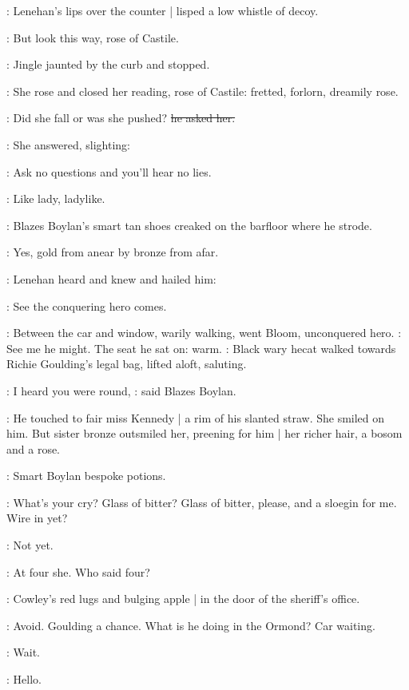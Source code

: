 
:
Lenehan's lips over the counter |
lisped a low whistle of decoy.

\lenehan:
But look this way, rose of Castile.

:
Jingle jaunted by the curb
and stopped.

:
She rose and closed her reading,
rose of Castile:
fretted, forlorn,
dreamily rose.

\lenehan:
Did she fall or was she pushed?
\sout{he asked her.}

:
She answered,
slighting:

\MissK:
Ask no questions and you'll hear no lies.

:
Like lady,
ladylike.

:
Blazes Boylan's smart tan shoes creaked on the barfloor
where he strode.

:
Yes, gold from anear
by bronze from afar.

:
Lenehan heard and knew and hailed him:

\lenehan:
See the conquering hero comes.

:
Between the car and window,
warily walking,
went Bloom,
unconquered hero.
\BloomInt:
See me he might.
The seat he sat on: warm.
:
Black wary hecat walked towards Richie Goulding's legal bag,
lifted aloft, saluting.


\boylan:
I heard you were round,
:
said Blazes Boylan.

:
He touched to fair miss Kennedy |
a rim of his slanted straw.
She smiled on him.
But sister bronze outsmiled her,
preening for him |
her richer hair,
a bosom
and a rose.

:
Smart Boylan bespoke potions.

\boylan:
What's your cry?
Glass of bitter?
Glass of bitter, please,
and a sloegin for me.
Wire in yet?

\MissD:
Not yet.

\BloomInt:
At four she.
Who said four?

:
Cowley's red lugs and bulging apple |
in the door of the sheriff's office.

\BloomInt:
Avoid.
Goulding a chance.
What is he doing in the Ormond?
Car waiting.

\BloomInt:
Wait.

\BloomInt:
Hello.


